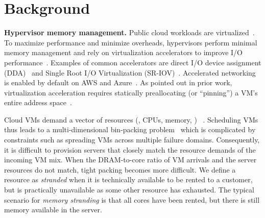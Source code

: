 



\section{Background}
\label{sec-bg}

{\bf Hypervisor memory management.}
Public cloud workloads are virtualized~\cite{firecracker.nsdi20}.
To maximize performance and minimize overheads, hypervisors perform minimal memory management and rely on
virtualization accelerators to improve I/O performance~\cite{intelvtd.web20,nicpagefault.asplos17,leapio.asplos20,sriov}.
Examples of common accelerators are direct I/O device assignment
(DDA)~\cite{intelvtd.web20,nicpagefault.asplos17} and Single Root I/O
Virtualization (SR-IOV)~\cite{leapio.asplos20,sriov}.
Accelerated networking is enabled by default on AWS and Azure~\cite{awsaccelnet,azureaccelnet}.
As pointed out in prior work, virtualization acceleration requires statically preallocating (or ``pinning'') a VM's entire address space~\cite{nicpagefault.asplos17,tian2020coiommu,yassour2010dma,willmann2008protection,amit2011viommu,ben2010turtles}.

 Cloud VMs demand a vector of resources
(\eg, CPUs, memory, \etc)
~\cite{resourcecentral.sosp17, hadary2020protean,
googlejobpacking.cluster14, borg.eurosys15}.
Scheduling VMs thus leads to a multi-dimensional bin-packing
problem~\cite{binpackheuristics.web11, tetris.sigcomm14, hadary2020protean, bpbounds.stoc13}
which is complicated by constraints such as spreading VMs across multiple failure
domains.
Consequently, it is difficult to provision servers that closely
match the resource demands of the incoming VM mix.
When the DRAM-to-core ratio of VM arrivals and the server resources
do not match, tight packing becomes more difficult.
%
We define a resource as \emph{stranded} when
it is technically available to be rented to a customer, but is
practically unavailable as some other resource has exhausted. The typical scenario for {\em
memory stranding} is that all cores have been
rented, but there is still memory available in the server.



